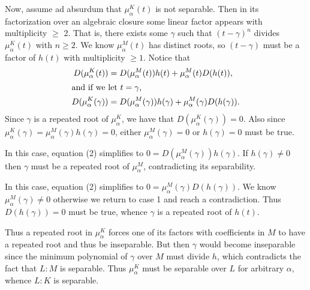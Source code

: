 \documentclass{article}
\begin{document}
\begin{solution}
  Now, assume ad absurdum that \( \mu_{\alpha}^{K}(t) \) is not separable.
  Then in its factorization over an algebraic closure some linear factor appears with multiplicity \( \geq \) 2.
  That is, there exists some \( \gamma \) such that \( (t-\gamma)^n \) divides \( \mu_{\alpha}^{K}(t) \) with \( n\geq 2 \).
  We know \( \mu_{\alpha}^{M}(t) \) has distinct roots, so \( (t-\gamma) \) must be a factor of \( h(t) \) with multiplicity \( \geq 1 \).
  Notice that \begin{align}
    D(\mu_\alpha^K(t)) &= D(\mu_{\alpha}^{M}(t)) h(t)+\mu_{\alpha}^{M}(t) D(h(t)), \\
    \intertext{and if we let \( t=\gamma \),}
    D(\mu_\alpha^K(\gamma)) &= D(\mu_{\alpha}^{M}(\gamma)) h(\gamma)+\mu_{\alpha}^{M}(\gamma) D(h(\gamma)).
  \end{align}
  Since \( \gamma \) is a repeated root of \( \mu_\alpha^K \), we have that \( D(\mu_\alpha^K(\gamma))=0 \).
  Also since \( \mu_\alpha^K(\gamma) = \mu_{\alpha}^{M}(\gamma) h(\gamma) = 0 \), either \( \mu_{\alpha}^{M}(\gamma) = 0 \) or \( h(\gamma) = 0 \) must be true.
  \begin{subproof}[Case 1 (\( \mu_{\alpha}^{M}(\gamma) = 0 \)).]
    In this case, equation (2) simplifies to \( 0 = D(\mu_{\alpha}^{M}(\gamma)) h(\gamma) \).
    If \( h(\gamma) \neq 0 \) then \( \gamma \) must be a repeated root of \( \mu_\alpha^M \), contradicting its separability.
  \end{subproof}
  \begin{subproof}[Case 2 (\( h(\gamma) = 0 \)).]
    In this case, equation (2) simplifies to \( 0 = \mu_{\alpha}^{M}(\gamma) D(h(\gamma)) \).
    We know \( \mu_{\alpha}^{M}(\gamma) \neq 0 \) otherwise we return to case 1 and reach a contradiction.
    Thus \( D(h(\gamma)) = 0 \) must be true, whence \( \gamma \) is a repeated root of \( h(t) \).
  \end{subproof}
  Thus a repeated root in \( \mu_\alpha^K \) forces one of its factors with coefficients in \( M \) to have a repeated root and thus be inseparable.
  But then \( \gamma \) would become inseparable since the minimum polynomial of \( \gamma \) over \( M \) must divide \( h \), which contradicts the fact that \( L:M \) is separable.
  Thus \( \mu_\alpha^K \) must be separable over \( L \) for arbitrary \( \alpha \), whence \( L:K \) is separable.
\end{solution}
\end{document}
